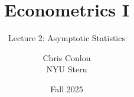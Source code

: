 



















\title{Econometrics I}
\subtitle{Lecture 2: Asymptotic Statistics}

\author{Chris Conlon \\NYU Stern}
\date{Fall 2025}
\maketitle


